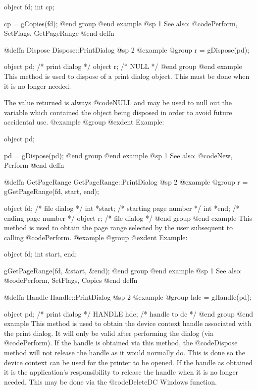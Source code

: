 object  fd;
int     cp;

cp = gCopies(fd);
@end group
@end example
@sp 1
See also:  @code{Perform, SetFlags, GetPageRange}
@end deffn









@deffn {Dispose} Dispose::PrintDialog
@sp 2
@example
@group
r = gDispose(pd);

object  pd;     /*  print dialog   */
object  r;      /*  NULL           */
@end group
@end example
This method is used to dispose of a print dialog object.  This must
be done when it is no longer needed.

The value returned is always @code{NULL} and may be used to null out
the variable which contained the object being disposed in order to
avoid future accidental use.
@example
@group
@exdent Example:

object  pd;

pd = gDispose(pd);
@end group
@end example
@sp 1
See also:  @code{New, Perform}
@end deffn











@deffn {GetPageRange} GetPageRange::PrintDialog
@sp 2
@example
@group
r = gGetPageRange(fd, start, end);

object  fd;     /*  file dialog           */
int     *start; /*  starting page number  */
int     *end;   /*  ending page number    */
object  r;      /*  file dialog           */
@end group
@end example
This method is used to obtain the page range selected by the user
subsequent to calling @code{Perform}.
@example
@group
@exdent Example:

object  fd;
int     start, end;

gGetPageRange(fd, &start, &end);
@end group
@end example
@sp 1
See also:  @code{Perform, SetFlags, Copies}
@end deffn











@deffn {Handle} Handle::PrintDialog
@sp 2
@example
@group
hdc = gHandle(pd);

object  pd;     /*  print dialog   */
HANDLE  hdc;    /*  handle to dc   */
@end group
@end example
This method is used to obtain the device context handle associated with
the print dialog.  It will only be valid after performing the
dialog (via @code{Perform}).  If the handle is obtained via this method,
the @code{Dispose} method will not release the handle as it would
normally do.  This is done so the device context can be used for the
printer to be opened.  If the handle as obtained it is the application's
responsibility to release the handle when it is no longer needed.  This
may be done via the @code{DeleteDC} Windows function.

